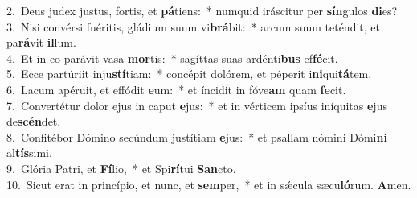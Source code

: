 {2.~}Deus judex justus, fortis, et \textbf{pá}tiens:~* numquid iráscitur per \textbf{sín}gulos \textbf{di}es?\\
{3.~}Nisi convérsi fuéritis, gládium suum vi\textbf{brá}bit:~* arcum suum teténdit, et pa\textbf{rá}vit \textbf{il}lum.\\
{4.~}Et in eo parávit vasa \textbf{mor}tis:~* sagíttas suas ardénti\textbf{bus} ef\textbf{fé}cit.\\
{5.~}Ecce partúriit inju\textbf{stí}tiam:~* concépit dolórem, et péperit i\textbf{ni}qui\textbf{tá}tem.\\
{6.~}Lacum apéruit, et effódit \textbf{e}um:~* et íncidit in fóve\textbf{am} quam \textbf{fe}cit.\\
{7.~}Convertétur dolor ejus in caput \textbf{e}jus:~* et in vérticem ipsíus iníquitas \textbf{e}jus de\textbf{scén}det.\\
{8.~}Confitébor Dómino secúndum justítiam \textbf{e}jus:~* et psallam nómini Dómi\textbf{ni} al\textbf{tís}simi.\\
{9.~}Glória Patri, et \textbf{Fí}lio,~* et Spi\textbf{rí}tui \textbf{San}cto.\\
{10.~}Sicut erat in princípio, et nunc, et \textbf{sem}per,~* et in sǽcula sæcu\textbf{ló}rum. \textbf{A}men.\\

